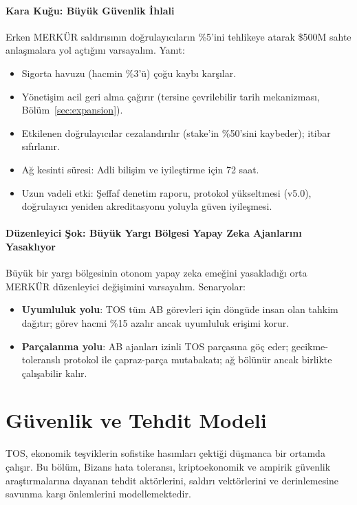 \documentclass[11pt]{article}
\begin{document}
\begin{itemize}[noitemsep]
\begin{itemize}[noitemsep]
\begin{itemize}[noitemsep]
\begin{itemize}[noitemsep]
\begin{itemize}[noitemsep]
\begin{itemize}[noitemsep]
\begin{itemize}[noitemsep]
\begin{enumerate}[noitemsep]
\begin{itemize}[noitemsep]
\paragraph{Kara Kuğu: Büyük Güvenlik İhlali}
Erken MERKÜR saldırısının doğrulayıcıların \%5'ini tehlikeye atarak \$500M sahte anlaşmalara yol açtığını varsayalım. Yanıt:
\begin{itemize}[noitemsep]
  \item Sigorta havuzu (hacmin \%3'ü) çoğu kaybı karşılar.
  \item Yönetişim acil geri alma çağırır (tersine çevrilebilir tarih mekanizması, Bölüm~\ref{sec:expansion}).
  \item Etkilenen doğrulayıcılar cezalandırılır (stake'in \%50'sini kaybeder); itibar sıfırlanır.
  \item Ağ kesinti süresi: Adli bilişim ve iyileştirme için 72 saat.
  \item Uzun vadeli etki: Şeffaf denetim raporu, protokol yükseltmesi (v5.0), doğrulayıcı yeniden akreditasyonu yoluyla güven iyileşmesi.
\end{itemize}

\paragraph{Düzenleyici Şok: Büyük Yargı Bölgesi Yapay Zeka Ajanlarını Yasaklıyor}
Büyük bir yargı bölgesinin otonom yapay zeka emeğini yasakladığı orta MERKÜR düzenleyici değişimini varsayalım. Senaryolar:
\begin{itemize}[noitemsep]
  \item \textbf{Uyumluluk yolu}: TOS tüm AB görevleri için döngüde insan olan tahkim dağıtır; görev hacmi \%15 azalır ancak uyumluluk erişimi korur.
  \item \textbf{Parçalanma yolu}: AB ajanları izinli TOS parçasına göç eder; gecikme-toleranslı protokol ile çapraz-parça mutabakatı; ağ bölünür ancak birlikte çalışabilir kalır.
\end{itemize}

\section{Güvenlik ve Tehdit Modeli}
\label{sec:security}

TOS, ekonomik teşviklerin sofistike hasımları çektiği düşmanca bir ortamda çalışır. Bu bölüm, Bizans hata toleransı, kriptoekonomik ve ampirik güvenlik araştırmalarına dayanan tehdit aktörlerini, saldırı vektörlerini ve derinlemesine savunma karşı önlemlerini modellemektedir.


\end{itemize}
\end{enumerate}
\end{itemize}
\end{itemize}
\end{itemize}
\end{itemize}
\end{itemize}
\end{itemize}
\end{itemize}
\end{document}
